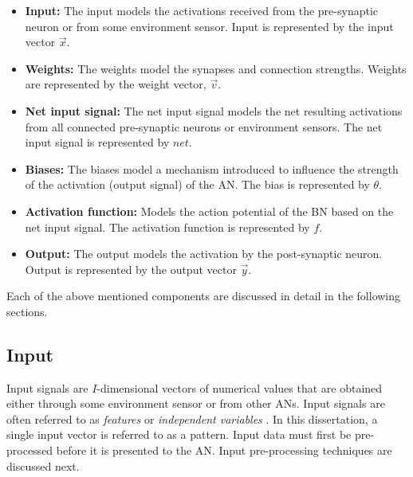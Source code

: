 \begin{itemize}
    \item
    \textbf{Input:} The input models the activations received from the pre-synaptic neuron
    or from some environment sensor. Input is represented by the input vector
    $\vec{x}$.

    \item
    \textbf{Weights:} The weights model the synapses and connection
    strengths. Weights are represented by the weight vector, $\vec{v}$.

    \item
    \textbf{Net input signal:} The net input signal models
    the net resulting activations from all connected pre-synaptic neurons or
    environment sensors. The net input signal is
    represented by $net$.

    \item
    \textbf{Biases:} The biases model a mechanism introduced to influence the strength of the
    activation (output signal) of the \ac{AN}. The bias is
    represented by $\theta$.

    \item
    \textbf{Activation function:} Models the action potential of the
    \ac{BN} based on the net input signal. The activation function is
    represented by $f$.

    \item
    \textbf{Output:} The output models the activation by the post-synaptic neuron. Output is
    represented by the output vector $\vec{y}$.
\end{itemize}

Each of the above mentioned components are discussed in detail in the following
sections.


\subsection{Input}
\label{sec:anns:an:input}

Input signals are $I$-dimensional vectors of numerical values that are obtained
either through some environment sensor or from other \acp{AN}. Input signals
are often referred to as \textit{features} or \textit{independent variables} \cite{ref:francis:2001}. In this
dissertation, a single input vector is referred to as a pattern. Input data must first
be pre-processed before it is presented to the \ac{AN}. Input pre-processing
techniques are discussed next.



